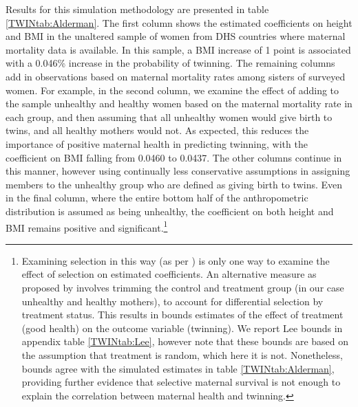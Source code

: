Results for this simulation methodology are presented in table 
\ref{TWINtab:Alderman}.  The first column shows the estimated coefficients on 
height and BMI in the unaltered sample of women from DHS countries where 
maternal mortality data is available.  In this sample, a BMI increase of 1 
point is associated with a 0.046\% increase in the probability of twinning. The 
remaining columns add in observations based on maternal mortality rates among 
sisters of surveyed women.  For example, in the second column, we examine the 
effect of adding to the sample unhealthy and healthy women based on the maternal 
mortality rate in each group, and then assuming that all unhealthy women would 
give birth to twins, and all healthy mothers would not. As expected, this 
reduces the importance of positive maternal health in predicting twinning, with 
the coefficient on BMI falling from 0.0460 to 0.0437. The other columns continue 
in this manner, however using continually less conservative assumptions in 
assigning members to the unhealthy group who are defined as giving birth to 
twins. Even in the final column, where the entire bottom half of the 
anthropometric distribution is assumed as being unhealthy, the coefficient on 
both height and BMI remains positive and significant.\footnote{Examining 
selection in this way (as per \citet{Aldermanetal2011}) is only one way to 
examine the effect of selection on estimated coefficients.  An alternative 
measure as proposed by \citet{Lee2009} involves trimming the control and 
treatment group (in our case unhealthy and healthy mothers), to account for 
differential selection by treatment status.  This results in bounds estimates 
of the effect of treatment (good health) on the outcome variable (twinning). We 
report Lee bounds in appendix table \ref{TWINtab:Lee}, however note that these 
bounds are based on the assumption that treatment is random, which here it is 
not.  Nonetheless, \citet{Lee2009} bounds agree with the simulated estimates in 
table \ref{TWINtab:Alderman}, providing further evidence that selective maternal 
survival is not enough to explain the correlation between maternal health and 
twinning.}

